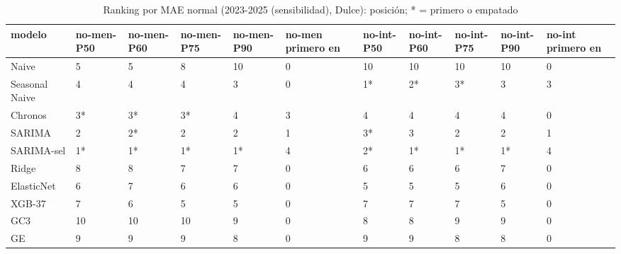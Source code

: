 \begin{table}[H]
\centering
\small
\caption{Ranking por MAE normal (2023-2025 (sensibilidad), Dulce): posición; * = primero o empatado}
\label{tab:T08_ranking_normal_sensibilidad_2023_2025_dulce}
\begin{tabular}{lllllllllll}
\toprule
modelo & no-men-P50 & no-men-P60 & no-men-P75 & no-men-P90 & no-men primero en & no-int-P50 & no-int-P60 & no-int-P75 & no-int-P90 & no-int primero en \\
\midrule
Naive & 5 & 5 & 8 & 10 & 0 & 10 & 10 & 10 & 10 & 0 \\
Seasonal Naive & 4 & 4 & 4 & 3 & 0 & 1* & 2* & 3* & 3 & 3 \\
Chronos & 3* & 3* & 3* & 4 & 3 & 4 & 4 & 4 & 4 & 0 \\
SARIMA & 2 & 2* & 2 & 2 & 1 & 3* & 3 & 2 & 2 & 1 \\
SARIMA-sel & 1* & 1* & 1* & 1* & 4 & 2* & 1* & 1* & 1* & 4 \\
Ridge & 8 & 8 & 7 & 7 & 0 & 6 & 6 & 6 & 7 & 0 \\
ElasticNet & 6 & 7 & 6 & 6 & 0 & 5 & 5 & 5 & 6 & 0 \\
XGB-37 & 7 & 6 & 5 & 5 & 0 & 7 & 7 & 7 & 5 & 0 \\
GC3 & 10 & 10 & 10 & 9 & 0 & 8 & 8 & 9 & 9 & 0 \\
GE & 9 & 9 & 9 & 8 & 0 & 9 & 9 & 8 & 8 & 0 \\
\bottomrule
\end{tabular}
\end{table}